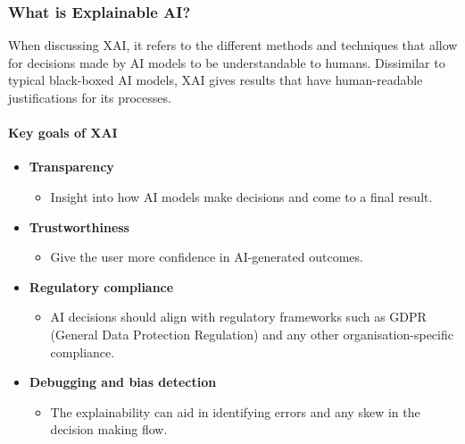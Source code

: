 \subsubsection*{What is Explainable AI?}
When discussing XAI, it refers to the different methods and techniques that allow for decisions made by AI models to be understandable to humans. Dissimilar to typical black-boxed AI models, XAI gives results that have human-readable justifications for its processes.

\paragraph{Key goals of XAI}\citep{guidotti2018survey}
\begin{itemize}
    \item \textbf{Transparency}
    \begin{itemize}
        \item Insight into how AI models make decisions and come to a final result.
    \end{itemize}
    \item \textbf{Trustworthiness}
    \begin{itemize}
        \item Give the user more confidence in AI-generated outcomes.
    \end{itemize}
    \item \textbf{Regulatory compliance}
    \begin{itemize}
        \item AI decisions should align with regulatory frameworks such as GDPR (General Data Protection Regulation) and any other organisation-specific compliance.
    \end{itemize}
    \item \textbf{Debugging and bias detection}
    \begin{itemize}
        \item The explainability can aid in identifying errors and any skew in the decision making flow.
    \end{itemize}
\end{itemize}

